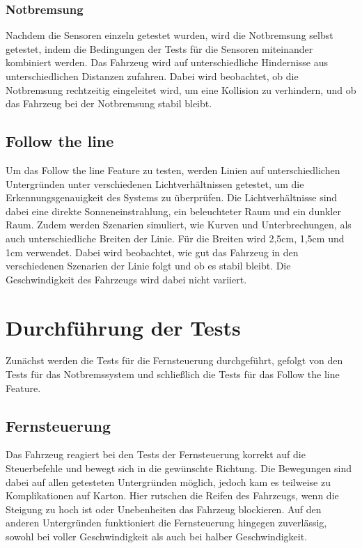         \subsubsection{Notbremsung}
        Nachdem die Sensoren einzeln getestet wurden, wird die Notbremsung selbst getestet, indem die Bedingungen der Tests für die Sensoren miteinander kombiniert werden. Das Fahrzeug wird auf unterschiedliche Hindernisse aus unterschiedlichen Distanzen zufahren. Dabei wird beobachtet, ob die Notbremsung rechtzeitig eingeleitet wird, um eine Kollision zu verhindern, und ob das Fahrzeug bei der Notbremsung stabil bleibt.

    \subsection{Follow the line}
    Um das Follow the line Feature zu testen, werden Linien auf unterschiedlichen Untergründen unter verschiedenen Lichtverhältnissen getestet, um die Erkennungsgenauigkeit des Systems zu überprüfen. Die Lichtverhältnisse sind dabei eine direkte Sonneneinstrahlung, ein beleuchteter Raum und ein dunkler Raum. Zudem werden Szenarien simuliert, wie Kurven und Unterbrechungen, als auch unterschiedliche Breiten der Linie. Für die Breiten wird 2,5cm, 1,5cm und 1cm verwendet. Dabei wird beobachtet, wie gut das Fahrzeug in den verschiedenen Szenarien der Linie folgt und ob es stabil bleibt. Die Geschwindigkeit des Fahrzeugs wird dabei nicht variiert.

\section{Durchführung der Tests}
Zunächst werden die Tests für die Fernsteuerung durchgeführt, gefolgt von den Tests für das Notbremssystem und schließlich die Tests für das Follow the line Feature. 
    \subsection{Fernsteuerung}
    Das Fahrzeug reagiert bei den Tests der Fernsteuerung korrekt auf die Steuerbefehle und bewegt sich in die gewünschte Richtung. Die Bewegungen sind dabei auf allen getesteten Untergründen möglich, jedoch kam es teilweise zu Komplikationen auf Karton. Hier rutschen die Reifen des Fahrzeugs, wenn die Steigung zu hoch ist oder Unebenheiten das Fahrzeug blockieren. Auf den anderen Untergründen funktioniert die Fernsteuerung hingegen zuverlässig, sowohl bei voller Geschwindigkeit als auch bei halber Geschwindigkeit.

